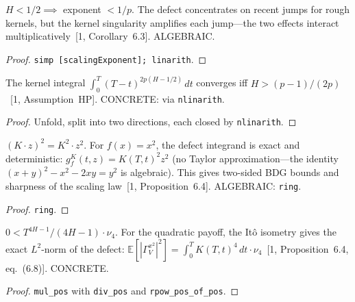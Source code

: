 \begin{theorem}\label{thm:rough_exponent_less}
\leanok
{}
$H < 1/2 \implies$ exponent $< 1/p$. The defect concentrates on recent jumps for rough kernels, but the kernel singularity amplifies each jump---the two effects interact multiplicatively~[1, Corollary~6.3]. ALGEBRAIC.
\end{theorem}
\begin{proof}\leanok \texttt{simp [scalingExponent]; linarith}.\end{proof}

\begin{theorem}[Convergence condition for $r = 2p$]\label{thm:convergence_condition_2p}
\leanok
The kernel integral $\int_0^T (T-t)^{2p(H-1/2)}\,dt$ converges iff $H > (p-1)/(2p)$~[1, Assumption~HP]. CONCRETE: via \texttt{nlinarith}.
\end{theorem}
\begin{proof}\leanok Unfold, split into two directions, each closed by \texttt{nlinarith}.\end{proof}

\begin{theorem}\label{thm:quadratic_defect_exact}
\leanok
$(K \cdot z)^2 = K^2 \cdot z^2$. For $f(x) = x^2$, the defect integrand is exact and deterministic: $g_f^K(t,z) = K(T,t)^2 z^2$ (no Taylor approximation---the identity $(x+y)^2 - x^2 - 2xy = y^2$ is algebraic). This gives two-sided BDG bounds and sharpness of the scaling law~[1, Proposition~6.4]. ALGEBRAIC: \texttt{ring}.
\end{theorem}
\begin{proof}\leanok \texttt{ring}.\end{proof}

\begin{theorem}\label{thm:varianceSwapIsometry_pos}
\leanok
$0 < T^{4H-1}/(4H-1) \cdot \nu_4$. For the quadratic payoff, the It\^o isometry gives the exact $L^2$-norm of the defect: $\mathbb{E}[|\Gamma_V^{x^2}|^2] = \int_0^T K(T,t)^4\,dt \cdot \nu_4$~[1, Proposition~6.4, eq.~(6.8)]. CONCRETE.
\end{theorem}
\begin{proof}\leanok \texttt{mul\_pos} with \texttt{div\_pos} and \texttt{rpow\_pos\_of\_pos}.\end{proof}

